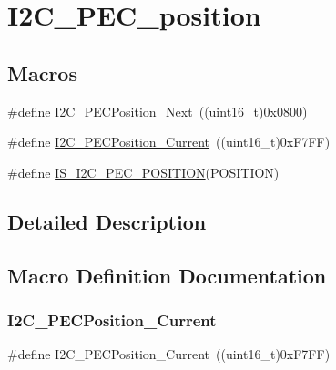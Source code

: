 \hypertarget{group___i2_c___p_e_c__position}{}\section{I2\+C\+\_\+\+P\+E\+C\+\_\+position}
\label{group___i2_c___p_e_c__position}
\subsection*{Macros}
\begin{DoxyCompactItemize}
\item 
\#define \mbox{\hyperlink{group___i2_c___p_e_c__position_ga74d0996efe6e278fb28d053ba78fccc5}{I2\+C\+\_\+\+P\+E\+C\+Position\+\_\+\+Next}}~((uint16\+\_\+t)0x0800)
\item 
\#define \mbox{\hyperlink{group___i2_c___p_e_c__position_ga8a393364dd651f88bcaebac71c1c52c7}{I2\+C\+\_\+\+P\+E\+C\+Position\+\_\+\+Current}}~((uint16\+\_\+t)0x\+F7\+F\+F)
\item 
\#define \mbox{\hyperlink{group___i2_c___p_e_c__position_gac8611a62b06256b1b3c60d4859a016ef}{I\+S\+\_\+\+I2\+C\+\_\+\+P\+E\+C\+\_\+\+P\+O\+S\+I\+T\+I\+ON}}(P\+O\+S\+I\+T\+I\+ON)
\end{DoxyCompactItemize}


\subsection{Detailed Description}


\subsection{Macro Definition Documentation}
\mbox{\label{group___i2_c___p_e_c__position_ga8a393364dd651f88bcaebac71c1c52c7}} 
\subsubsection{\texorpdfstring{I2C\_PECPosition\_Current}{I2C\_PECPosition\_Current}}
{\footnotesize\ttfamily \#define I2\+C\+\_\+\+P\+E\+C\+Position\+\_\+\+Current~((uint16\+\_\+t)0x\+F7\+F\+F)}

\mbox{\label{group___i2_c___p_e_c__position_ga74d0996efe6e278fb28d053ba78fccc5}} 
